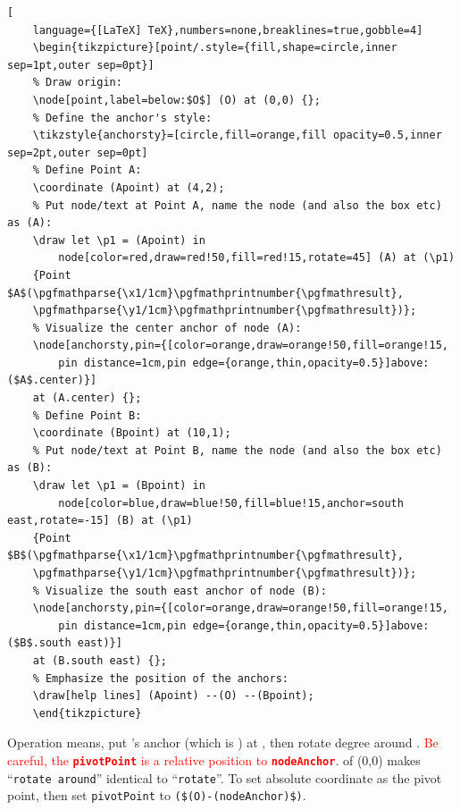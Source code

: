 \documentclass[lualatex]{jlreq}
\begin{document}
\begin{lstlisting}[
    language={[LaTeX] TeX},numbers=none,breaklines=true,gobble=4]
    \begin{tikzpicture}[point/.style={fill,shape=circle,inner sep=1pt,outer sep=0pt}]
    % Draw origin:
    \node[point,label=below:$O$] (O) at (0,0) {};
    % Define the anchor's style:
    \tikzstyle{anchorsty}=[circle,fill=orange,fill opacity=0.5,inner sep=2pt,outer sep=0pt]
    % Define Point A:
    \coordinate (Apoint) at (4,2);
    % Put node/text at Point A, name the node (and also the box etc) as (A):
    \draw let \p1 = (Apoint) in
        node[color=red,draw=red!50,fill=red!15,rotate=45] (A) at (\p1)
    {Point $A$(\pgfmathparse{\x1/1cm}\pgfmathprintnumber{\pgfmathresult},
    \pgfmathparse{\y1/1cm}\pgfmathprintnumber{\pgfmathresult})};
    % Visualize the center anchor of node (A):
    \node[anchorsty,pin={[color=orange,draw=orange!50,fill=orange!15,
        pin distance=1cm,pin edge={orange,thin,opacity=0.5}]above:($A$.center)}]
    at (A.center) {};
    % Define Point B:
    \coordinate (Bpoint) at (10,1);
    % Put node/text at Point B, name the node (and also the box etc) as (B):
    \draw let \p1 = (Bpoint) in
        node[color=blue,draw=blue!50,fill=blue!15,anchor=south east,rotate=-15] (B) at (\p1)
    {Point $B$(\pgfmathparse{\x1/1cm}\pgfmathprintnumber{\pgfmathresult},
    \pgfmathparse{\y1/1cm}\pgfmathprintnumber{\pgfmathresult})};
    % Visualize the south east anchor of node (B):
    \node[anchorsty,pin={[color=orange,draw=orange!50,fill=orange!15,
        pin distance=1cm,pin edge={orange,thin,opacity=0.5}]above:($B$.south east)}]
    at (B.south east) {};
    % Emphasize the position of the anchors:
    \draw[help lines] (Apoint) --(O) --(Bpoint);
    \end{tikzpicture}
\end{lstlisting}

Operation  means, put 's anchor (which is ) at , then rotate  degree around . %
\textcolor{red}{Be careful, the \textbf{\texttt{pivotPoint}} is a relative position to \textbf{\texttt{nodeAnchor}}}.
 of (0,0) makes ``\verb|rotate around|'' identical to ``\verb|rotate|''. To set absolute coordinate  as the pivot point, then set \lstinline{pivotPoint} to \lstinline{($(O)-(nodeAnchor)$)}. %
\end{document}
